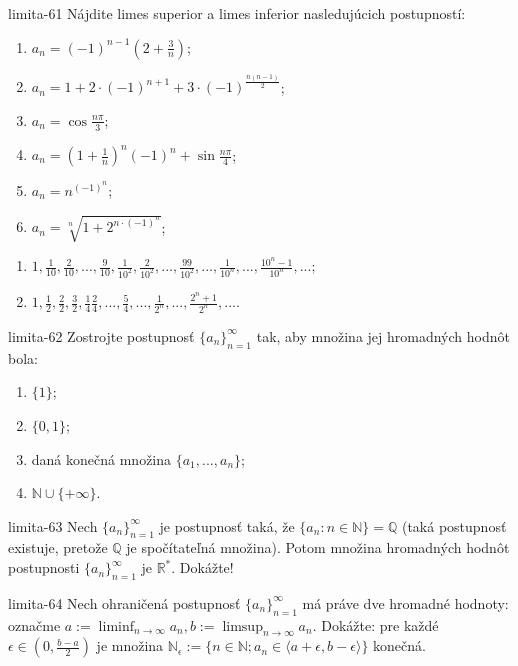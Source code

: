 \begin{defproblem}{limita-61}
Nájdite limes superior a limes inferior nasledujúcich postupností:
\begin{multicols}{2}
\begin{enumerate}
    \item $a_n=(-1)^{n-1}(2+\frac{3}{n})$;
    \item $a_n=1+2 \cdot (-1)^{n+1}+3 \cdot (-1)^{\frac{n(n-1)}{2}}$;
    \item $a_n=\cos \frac{n \pi}{3}$;
    \item $a_n=(1+\frac{1}{n})^n(-1)^n+\sin \frac{n \pi}{4}$;
    \item $a_n=n^{(-1)^n}$;
    \item $a_n=\sqrt[n]{1+2^{n \cdot (-1)^n}}$;
\end{enumerate}
\end{multicols}
\begin{enumerate}[resume]
    \item $1,\frac{1}{10},\frac{2}{10},...,\frac{9}{10},\frac{1}{10^2},\frac{2}{10^2},...,\frac{99}{10^2},...,\frac{1}{10^n},...,\frac{10^n-1}{10^n},...$;
    \item $1,\frac{1}{2},\frac{2}{2},\frac{3}{2},\frac{1}{4}\frac{2}{4},...,\frac{5}{4},...,\frac{1}{2^n},...,\frac{2^n+1}{2^n},... $.
\end{enumerate}
\end{defproblem}

\begin{defproblem}{limita-62}
Zostrojte postupnosť ${\{a_n\}}_{n=1}^\infty$ tak, aby množina jej hromadných hodnôt bola:
\begin{enumerate}
\item $\{ 1\}$;
\item $\{ 0,1\}$;
\item daná konečná množina $\{ a_1,...,a_n\}$;
\item $\mathbb{N} \cup \{ +\infty \}$.
\end{enumerate}
\end{defproblem}

\begin{defproblem}{limita-63}
Nech ${\{a_n\}}_{n=1}^\infty$ je postupnosť taká, že $\{ a_n: n \in \mathbb{N} \}=\mathbb{Q}$ (taká postupnosť existuje, pretože $\mathbb{Q}$ je spočítateľná množina). Potom množina hromadných hodnôt postupnosti ${\{a_n\}}_{n=1}^\infty$ je $\mathbb{R^*}$. Dokážte!
\end{defproblem}

\begin{defproblem}{limita-64}
Nech ohraničená postupnosť ${\{a_n\}}_{n=1}^\infty$ má práve dve hromadné hodnoty: označme $a := \liminf_{n \rightarrow \infty} a_n,b := \limsup_{n \rightarrow \infty} a_n$. Dokážte: pre každé $\epsilon \in (0,\frac{b-a}{2})$ je množina $\mathbb{N_\epsilon} := \{n \in \mathbb{N}; a_n \in \langle a+\epsilon, b-\epsilon \rangle \}$ konečná.
\end{defproblem}

